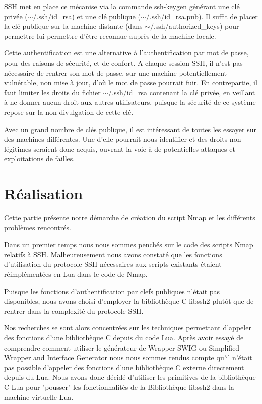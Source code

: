 \documentclass[frenchb]{article}
\begin{document}
SSH met en place ce mécanise via la commande \textsf{ssh-keygen} générant une clé privée (\textsf{$\sim$/.ssh/id\_rsa}) et une clé publique (\textsf{$\sim$/.ssh/id\_rsa.pub}). Il suffit de placer la clé publique sur la machine distante (dans \textsf{$\sim$/.ssh/authorized\_keys}) pour permettre lui permettre d'être reconnue auprès de la machine locale.

Cette authentification est une alternative à l'authentification par mot de passe, pour des raisons de sécurité, et de confort. A chaque session SSH, il n'est pas nécessaire de rentrer son mot de passe, sur une machine potentiellement vulnérable, non mise à jour, d'où le mot de passe pourrait fuir. En contrepartie, il faut limiter les droits du fichier \textsf{$\sim$/.ssh/id\_rsa} contenant la clé privée, en veillant à ne donner aucun droit aux autres utilisateurs, puisque la sécurité de ce système repose sur la non-divulgation de cette clé.

Avec un grand nombre de clés publique, il est intéressant de toutes les essayer sur des machines différentes. Une d'elle pourrait nous identifier et des droits non-légitimes seraient donc acquis, ouvrant la voie à de potentielles attaques et exploitations de failles.

\clearpage
\section{R\'ealisation}
Cette partie pr\'esente notre d\'emarche de cr\'eation du script Nmap et les diff\'erents probl\`emes rencontr\'es.

Dans un premier temps nous nous sommes pench\'es sur le code des scripts Nmap relatifs à SSH. Malheureusement nous avons constat\'e que les fonctions d'utilisation du protocole SSH n\'ecessaires aux scripts existants \'etaient r\'eimpl\'ement\'ees en Lua dans le code de Nmap.

Puisque les fonctions d'authentification par clefs publiques n'\'etait pas disponibles, nous avons choisi d'employer la biblioth\`eque C \textsf{libssh2} plutôt que de rentrer dans la complexit\'e du protocole SSH.

Nos recherches se sont alors concentr\'ees sur les techniques permettant d'appeler des fonctions d'une biblioth\`eque C depuis du code Lua. Apr\`es avoir essay\'e de comprendre comment utiliser le g\'en\'erateur de Wrapper SWIG ou \textsf{Simplified Wrapper and Interface Generator} nous nous sommes rendus compte qu'il n'\'etait pas possible d'appeler des fonctions d'une biblioth\`eque C externe directement depuis du Lua. Nous avons donc d\'ecid\'e d'utiliser les primitives de la biblioth\`eque C Lua pour "pousser" les fonctionnalit\'es de la Biblioth\`eque \textsf{libssh2} dans la machine virtuelle Lua.
\end{document}
